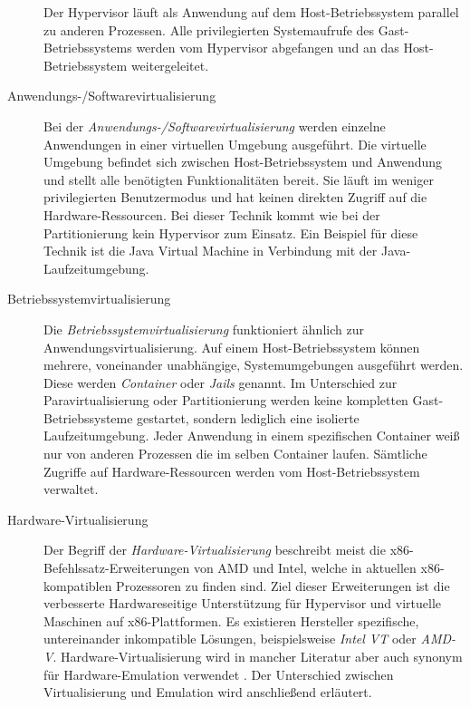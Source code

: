 \begin{description}
        Der Hypervisor läuft als Anwendung auf dem Host-Betriebssystem
        parallel zu anderen Prozessen.
        Alle privilegierten Systemaufrufe des Gast-Betriebssystems werden vom
        Hypervisor abgefangen und an das Host-Betriebssystem weitergeleitet.
    \item[Anwendungs-/Softwarevirtualisierung]
        Bei der \textit{Anwendungs-/Softwarevirtualisierung} werden einzelne
        Anwendungen in einer virtuellen Umgebung ausgeführt.
        Die virtuelle Umgebung befindet sich zwischen Host-Betriebssystem und
        Anwendung und stellt alle benötigten Funktionalitäten bereit.
        Sie läuft im weniger privilegierten Benutzermodus und hat keinen
        direkten Zugriff auf die Hardware-Ressourcen\cite{BSKompakt_Virt}.
        Bei dieser Technik kommt wie bei der Partitionierung kein Hypervisor
        zum Einsatz.
        Ein Beispiel für diese Technik ist die Java Virtual Machine in
        Verbindung mit der Java-Laufzeitumgebung.
    \item[Betriebssystemvirtualisierung]
        Die \textit{Betriebssystemvirtualisierung} funktioniert ähnlich zur
        Anwendungsvirtualisierung.
        Auf einem Host-Betriebssystem können mehrere, voneinander unabhängige,
        Systemumgebungen ausgeführt werden\cite{BSKompakt_Virt}.
        Diese werden \textit{Container} oder \textit{Jails} genannt.
        Im Unterschied zur Paravirtualisierung oder Partitionierung werden
        keine kompletten Gast-Betriebssysteme gestartet, sondern lediglich eine
        isolierte Laufzeitumgebung.
        Jeder Anwendung in einem spezifischen Container weiß nur von anderen
        Prozessen die im selben Container laufen.
        Sämtliche Zugriffe auf Hardware-Ressourcen werden vom
        Host-Betriebssystem verwaltet.
    \item[Hardware-Virtualisierung]
        Der Begriff der \textit{Hardware-Virtualisierung} beschreibt meist die
        x86-Befehlssatz-Erweiterungen von AMD und Intel, welche in aktuellen
        x86-kompatiblen Prozessoren zu finden sind\cite{BSKompakt_Virt}.
        Ziel dieser Erweiterungen ist die verbesserte Hardwareseitige
        Unterstützung für Hypervisor und virtuelle Maschinen auf
        x86-Plattformen.
        Es existieren Hersteller spezifische, untereinander inkompatible
        Lösungen, beispielsweise \textit{Intel VT} oder \textit{AMD-V}.
        Hardware-Virtualisierung wird in mancher Literatur aber auch synonym
        für Hardware-Emulation verwendet
        \cite{MasterkursVirtParaSys_Virt}.
        Der Unterschied zwischen Virtualisierung und Emulation wird
        anschließend erläutert.
\end{description}
\vspace{1ex}

